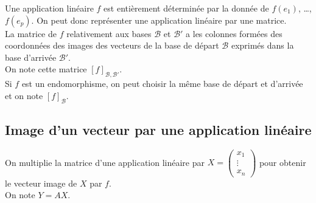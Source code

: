 		Une application linéaire $f$ est entièrement déterminée par la donnée de $f(e_1)$, \ldots, $f(e_p)$.
		On peut donc représenter une application linéaire par une matrice.\\
		
		La matrice de $f$ relativement aux bases $\mathcal{B}$ et $\mathcal{B}'$ a les colonnes formées des coordonnées des images des vecteurs de la base de départ $\mathcal{B}$ exprimés dans la base d'arrivée $\mathcal{B}'$.\\
		On note cette matrice $[f]_{\mathcal{B},\mathcal{B}'}$.\\
		
		Si $f$ est un endomorphisme, on peut choisir la même base  de départ et d'arrivée et on note $[f]_{\mathcal{B}}$.
	
	\subsection{Image d'un vecteur par une application linéaire}
		
		On multiplie la matrice d'une application linéaire par
		$X = \begin{pmatrix}
			     x_1\\ \vdots\\ x_n
		\end{pmatrix}$
		pour obtenir le vecteur image de $X$ par $f$.\\
		On note $Y = AX$.
		
